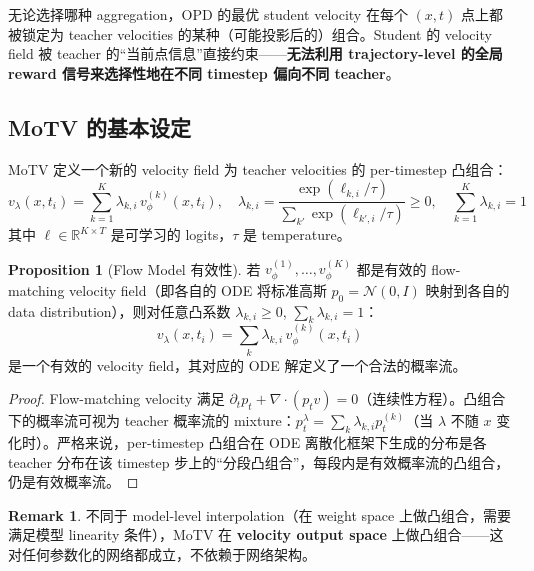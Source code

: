 \documentclass[11pt,a4paper]{article}
\newcommand{\R}{\mathbb{R}}
\newcommand{\N}{\mathcal{N}}
\newcommand{\vphi}{v_\phi}
\theoremstyle{definition}
\newtheorem{remark}{Remark}
\newtheorem{proposition}{Proposition}
\begin{document}
\begin{tcolorbox}[colback=red!5, colframe=red!50, title=OPD 的根本限制]
无论选择哪种 aggregation，OPD 的最优 student velocity 在每个 $(x, t)$ 点上都被锁定为 teacher velocities 的某种（可能投影后的）组合。Student 的 velocity field 被 teacher 的``当前点信息''直接约束——\textbf{无法利用 trajectory-level 的全局 reward 信号来选择性地在不同 timestep 偏向不同 teacher}。
\end{tcolorbox}

\subsection{MoTV 的基本设定}

MoTV 定义一个新的 velocity field 为 teacher velocities 的 per-timestep 凸组合：
\begin{equation}
v_{\lambda}(x, t_i) = \sum_{k=1}^K \lambda_{k,i}\, \vphi^{(k)}(x, t_i), \quad
\lambda_{k,i} = \frac{\exp(\ell_{k,i}/\tau)}{\sum_{k'}\exp(\ell_{k',i}/\tau)} \geq 0, \quad \sum_{k=1}^K \lambda_{k,i} = 1
\label{eq:motv_velocity}
\end{equation}
其中 $\ell \in \R^{K \times T}$ 是可学习的 logits，$\tau$ 是 temperature。

\begin{proposition}[Flow Model 有效性]
\label{prop:convex_flow}
若 $\vphi^{(1)}, \ldots, \vphi^{(K)}$ 都是有效的 flow-matching velocity field（即各自的 ODE 将标准高斯 $p_0 = \N(0, I)$ 映射到各自的 data distribution），则对任意凸系数 $\lambda_{k,i} \geq 0$, $\sum_k \lambda_{k,i} = 1$：
\begin{equation}
v_\lambda(x, t_i) = \sum_k \lambda_{k,i}\, \vphi^{(k)}(x, t_i)
\end{equation}
是一个有效的 velocity field，其对应的 ODE 解定义了一个合法的概率流。
\end{proposition}

\begin{proof}
Flow-matching velocity 满足 $\partial_t p_t + \nabla \cdot (p_t v) = 0$（连续性方程）。凸组合下的概率流可视为 teacher 概率流的 mixture：$p_t^\lambda = \sum_k \lambda_{k,i} p_t^{(k)}$（当 $\lambda$ 不随 $x$ 变化时）。严格来说，per-timestep 凸组合在 ODE 离散化框架下生成的分布是各 teacher 分布在该 timestep 步上的``分段凸组合''，每段内是有效概率流的凸组合，仍是有效概率流。
\end{proof}

\begin{remark}
不同于 model-level interpolation（在 weight space 上做凸组合，需要满足模型 linearity 条件），MoTV 在 \textbf{velocity output space} 上做凸组合——这对任何参数化的网络都成立，不依赖于网络架构。
\end{remark}
\end{document}
